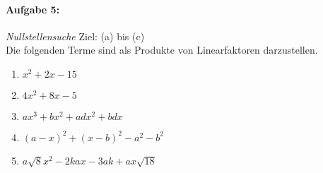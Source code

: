 \paragraph{Aufgabe 5: } \emph{Nullstellensuche} \hfill Ziel: (a) bis (c)\\[0.2cm]
Die folgenden Terme sind als Produkte von Linearfaktoren darzustellen.
\begin{enumerate}[label=(\alph*)]
    \item $x^2+2x-15$
    \item $4x^2+8x-5$
    \item $ax^3+bx^2+adx^2+bdx$
    \item $(a-x)^2+(x-b)^2-a^2-b^2$
    \item $a\sqrt{8}x^2-2kax-3ak+ax\sqrt{18}$
\end{enumerate}